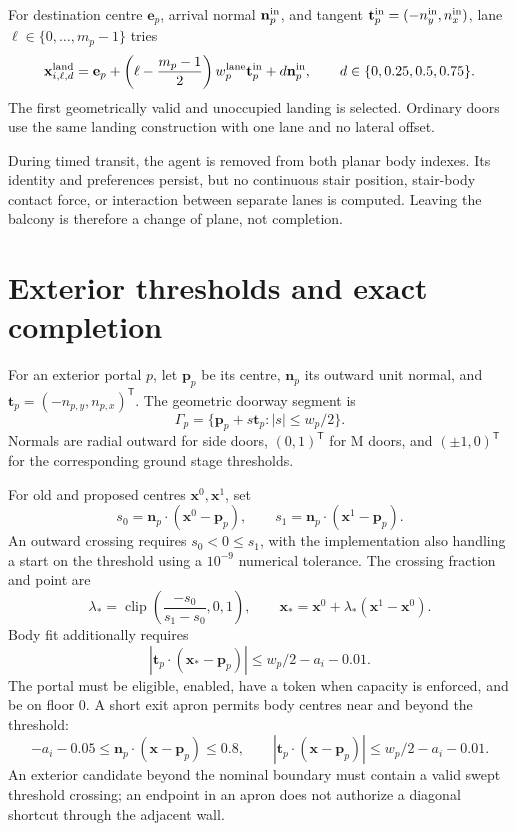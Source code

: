 \documentclass[11pt]{article}
\newcommand{\clip}{\operatorname{clip}}
\begin{document}
For destination centre $\mathbf e_p$, arrival normal $\mathbf n_p^{\rm in}$,
and tangent $\mathbf t_p^{\rm in}=(-n_y^{\rm in},n_x^{\rm in})$, lane
$\ell\in\{0,\ldots,m_p-1\}$ tries
\[
 \mathbf x^{\rm land}_{i,\ell,d}
 =\mathbf e_p+\left(\ell-\frac{m_p-1}{2}\right)w_p^{\rm lane}\mathbf t_p^{\rm in}
                +d\mathbf n_p^{\rm in},\qquad
 d\in\{0,0.25,0.5,0.75\}.
\]
The first geometrically valid and unoccupied landing is selected. Ordinary
doors use the same landing construction with one lane and no lateral offset.

During timed transit, the agent is removed from both planar body indexes.
Its identity and preferences persist, but no continuous stair position,
stair-body contact force, or interaction between separate lanes is computed.
Leaving the balcony is therefore a change of plane, not completion.

\section{Exterior thresholds and exact completion}

For an exterior portal $p$, let $\mathbf p_p$ be its centre,
$\mathbf n_p$ its outward unit normal, and
$\mathbf t_p=(-n_{p,y},n_{p,x})^{\mathsf T}$. The geometric doorway segment is
\[
 \Gamma_p=\{\mathbf p_p+s\mathbf t_p:|s|\leq w_p/2\}.
\]
Normals are radial outward for side doors, $(0,1)^{\mathsf T}$ for M doors,
and $(\pm1,0)^{\mathsf T}$ for the corresponding ground stage thresholds.

For old and proposed centres $\mathbf x^0,\mathbf x^1$, set
\[
 s_0=\mathbf n_p\cdot(\mathbf x^0-\mathbf p_p),\qquad
 s_1=\mathbf n_p\cdot(\mathbf x^1-\mathbf p_p).
\]
An outward crossing requires $s_0<0\leq s_1$, with the implementation also
handling a start on the threshold using a $10^{-9}$ numerical tolerance.
The crossing fraction and point are
\[
 \lambda_* = \clip\left(\frac{-s_0}{s_1-s_0},0,1\right),\qquad
 \mathbf x_*=\mathbf x^0+\lambda_*(\mathbf x^1-\mathbf x^0).
\]
Body fit additionally requires
\[
 |\mathbf t_p\cdot(\mathbf x_*-\mathbf p_p)|\leq w_p/2-a_i-0.01.
\]
The portal must be eligible, enabled, have a token when capacity is enforced,
and be on floor $0$. A short exit apron permits body centres near and beyond
the threshold:
\[
 -a_i-0.05\leq\mathbf n_p\cdot(\mathbf x-\mathbf p_p)\leq0.8,
 \qquad |\mathbf t_p\cdot(\mathbf x-\mathbf p_p)|\leq w_p/2-a_i-0.01.
\]
An exterior candidate beyond the nominal boundary must contain a valid swept
threshold crossing; an endpoint in an apron does not authorize a diagonal
shortcut through the adjacent wall.
\end{document}
